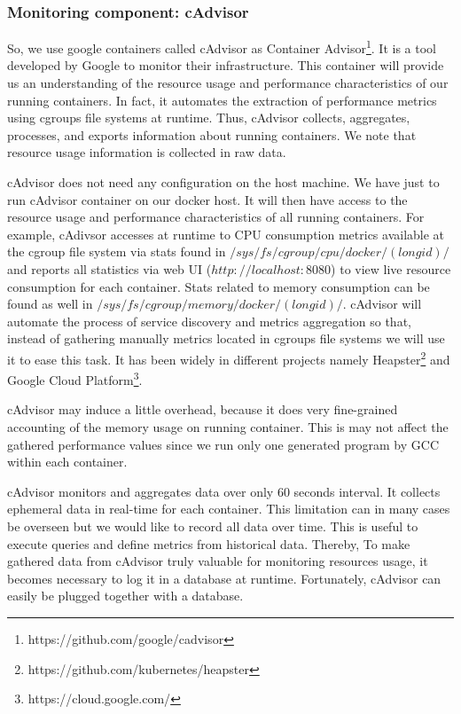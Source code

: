 \subsubsection{Monitoring component: cAdvisor}
So, we use google containers called cAdvisor as Container Advisor\footnote{https://github.com/google/cadvisor}. It is a tool developed by Google to monitor their infrastructure. This container will provide us an understanding of the resource usage and performance characteristics of our running containers. In fact, it automates the extraction of performance metrics using cgroups file systems at runtime. Thus, cAdvisor collects, aggregates, processes, and exports information about running containers. We note that resource usage information is collected in raw data.

cAdvisor does not need any configuration on the host machine. We have just to run cAdvisor container on our docker host. It will then have access to the resource usage and performance characteristics of all running containers. For example, cAdivsor accesses at runtime to CPU consumption metrics available at the cgroup file system via stats found in $/sys/fs/cgroup/cpu/docker/(longid)/$ and reports all statistics via web UI ($http://localhost:8080$) to view live resource consumption for each container. Stats related to memory consumption can be found as well in $/sys/fs/cgroup/memory/docker/(longid)/$. cAdvisor will automate the process of service discovery and metrics aggregation so that, instead of gathering manually metrics located in cgroups file systems we will use it to ease this task. It has been widely in different projects namely Heapster\footnote{https://github.com/kubernetes/heapster} and Google Cloud Platform\footnote{https://cloud.google.com/}.

cAdvisor may induce a little overhead, because it does very fine-grained accounting of the memory usage on running container. This is may not affect the gathered performance values since we run only one generated program by GCC within each container.

cAdvisor monitors and aggregates data over only 60 seconds interval. It collects ephemeral data in real-time for each container. This limitation can in many cases be overseen but we would like to record all data over time. This is useful to execute queries and define metrics from historical data. Thereby, To make gathered data from cAdvisor truly valuable for monitoring resources usage, it becomes necessary to log it in a database at runtime. Fortunately, cAdvisor can easily be plugged together with a database.
